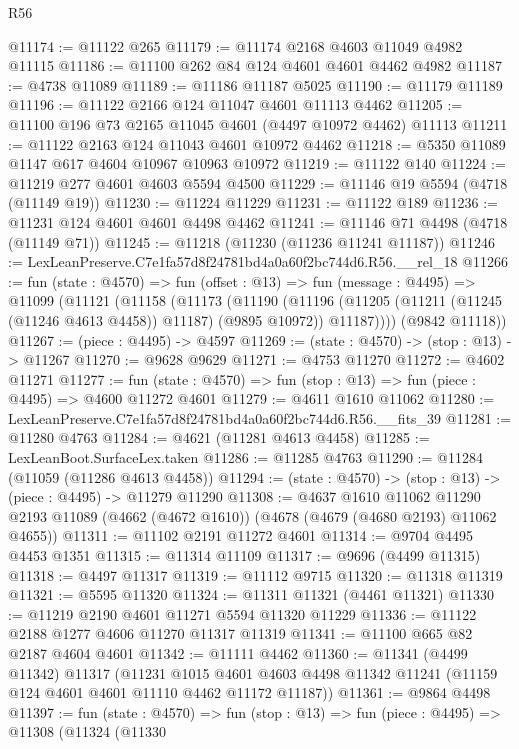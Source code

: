 \begin{lexlean}{R56}
\begin{coremodule}
@11174 := @11122 @265
@11179 := @11174 @2168 @4603 @11049 @4982 @11115
@11186 := @11100 @262 @84 @124 @4601 @4601 @4462 @4982
@11187 := @4738 @11089
@11189 := @11186 @11187 @5025
@11190 := @11179 @11189
@11196 := @11122 @2166 @124 @11047 @4601 @11113 @4462
@11205 := @11100 @196 @73 @2165 @11045 @4601 (@4497 @10972 @4462) @11113
@11211 := @11122 @2163 @124 @11043 @4601 @10972 @4462
@11218 := @5350 @11089 @1147 @617 @4604 @10967 @10963 @10972
@11219 := @11122 @140
@11224 := @11219 @277 @4601 @4603 @5594 @4500
@11229 := @11146 @19 @5594 (@4718 (@11149 @19))
@11230 := @11224 @11229
@11231 := @11122 @189
@11236 := @11231 @124 @4601 @4601 @4498 @4462
@11241 := @11146 @71 @4498 (@4718 (@11149 @71))
@11245 := @11218 (@11230 (@11236 @11241 @11187))
@11246 := LexLeanPreserve.C7e1fa57d8f24781bd4a0a60f2bc744d6.R56.__rel_18
@11266 := fun (state : @4570) =>
  fun (offset : @13) =>
  fun (message : @4495) =>
  @11099
    (@11121
      (@11158
        (@11173
          (@11190
            (@11196 (@11205 (@11211 (@11245 (@11246 @4613 @4458)) @11187) (@9895 @10972)) @11187))))
      (@9842 @11118))
@11267 := (piece : @4495) -> @4597
@11269 := (state : @4570) -> (stop : @13) -> @11267
@11270 := @9628 @9629
@11271 := @4753 @11270
@11272 := @4602 @11271
@11277 := fun (state : @4570) => fun (stop : @13) => fun (piece : @4495) => @4600 @11272 @4601
@11279 := @4611 @1610 @11062
@11280 := LexLeanPreserve.C7e1fa57d8f24781bd4a0a60f2bc744d6.R56.__fits_39
@11281 := @11280 @4763
@11284 := @4621 (@11281 @4613 @4458)
@11285 := LexLeanBoot.SurfaceLex.taken
@11286 := @11285 @4763
@11290 := @11284 (@11059 (@11286 @4613 @4458))
@11294 := (state : @4570) -> (stop : @13) -> (piece : @4495) -> @11279 @11290
@11308 := @4637
    @1610
    @11062
    @11290
    @2193
    @11089
    (@4662 (@4672 @1610))
    (@4678 (@4679 (@4680 @2193) @11062 @4655))
@11311 := @11102 @2191 @11272 @4601
@11314 := @9704 @4495 @4453 @1351
@11315 := @11314 @11109
@11317 := @9696 (@4499 @11315)
@11318 := @4497 @11317
@11319 := @11112 @9715
@11320 := @11318 @11319
@11321 := @5595 @11320
@11324 := @11311 @11321 (@4461 @11321)
@11330 := @11219 @2190 @4601 @11271 @5594 @11320 @11229
@11336 := @11122 @2188 @1277 @4606 @11270 @11317 @11319
@11341 := @11100 @665 @82 @2187 @4604 @4601
@11342 := @11111 @4462
@11360 := @11341
    (@4499 @11342)
    @11317
    (@11231
      @1015
      @4601
      @4603
      @4498
      @11342
      @11241
      (@11159 @124 @4601 @4601 @11110 @4462 @11172 @11187))
@11361 := @9864 @4498
@11397 := fun (state : @4570) =>
  fun (stop : @13) =>
  fun (piece : @4495) =>
  @11308
    (@11324
      (@11330

\end{coremodule}
\end{lexlean}
